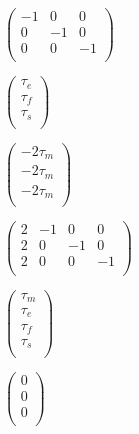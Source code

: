 \documentclass[a4paper,11pt,twoside,openright]{book}
\def\lthtmlcheckvsize{\ifdim\ht\sizebox<\vsize 
  \ifdim\wd\sizebox<\hsize\expandafter\hfill\fi \expandafter\vfill
  \else\expandafter\vss\fi}%
\begin{document}
{\newpage\clearpage
{}%
$\displaystyle \begin{pmatrix}
-1 &  0 &  0 \\
0 & -1 &  0 \\
0 &  0 & -1 \\
\end{pmatrix}$%
\lthtmlindisplaymathZ
\lthtmlcheckvsize\clearpage}

{\newpage\clearpage
{}%
$\displaystyle \begin{pmatrix}
\tau_e \\
\tau_f \\
\tau_s \\
\end{pmatrix}$%
\lthtmlindisplaymathZ
\lthtmlcheckvsize\clearpage}

{\newpage\clearpage
{}%
$\displaystyle \begin{pmatrix}
-2\tau_m \\
-2\tau_m \\
-2\tau_m \\
\end{pmatrix}$%
\lthtmlindisplaymathZ
\lthtmlcheckvsize\clearpage}

{\newpage\clearpage
{}%
$\displaystyle \begin{pmatrix}
2 & -1 &  0 &  0 \\
2 &  0 & -1 &  0 \\
2 &  0 &  0 & -1 \\
\end{pmatrix}$%
\lthtmlindisplaymathZ
\lthtmlcheckvsize\clearpage}

{\newpage\clearpage
{}%
$\displaystyle \begin{pmatrix}
\tau_m \\
\tau_e \\
\tau_f \\
\tau_s \\
\end{pmatrix}$%
\lthtmlindisplaymathZ
\lthtmlcheckvsize\clearpage}

{\newpage\clearpage
{}%
$\displaystyle \begin{pmatrix}
0 \\
0 \\
0 \\
\end{pmatrix}$%
\lthtmlindisplaymathZ
\lthtmlcheckvsize\clearpage}
\end{document}
